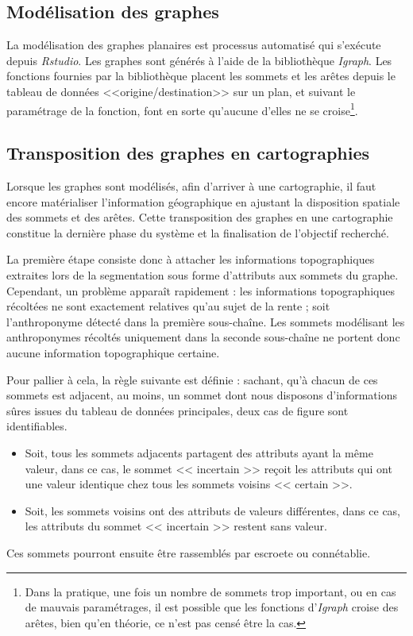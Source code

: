 \subsection{Modélisation des graphes}
La modélisation des graphes planaires est processus automatisé qui s'exécute depuis \textit{Rstudio}. Les graphes sont générés à l'aide de la bibliothèque \textit{Igraph}. Les fonctions fournies par la bibliothèque placent les sommets et les arêtes depuis le tableau de données <<origine/destination>> sur un plan, et suivant le paramétrage de la fonction, font en sorte qu'aucune d'elles ne se croise\footnote{Dans la pratique, une fois un nombre de sommets trop important, ou en cas de mauvais paramétrages, il est possible que les fonctions d'\textit{Igraph} croise des arêtes, bien qu'en théorie, ce n'est pas censé être la cas.}. 

\subsection{Transposition des graphes en cartographies}
Lorsque les graphes sont modélisés, afin d'arriver à une cartographie, il faut encore matérialiser l'information géographique en ajustant la disposition spatiale des sommets et des arêtes. Cette transposition des graphes en une cartographie constitue la dernière phase du système et la finalisation de l'objectif recherché. 

La première étape consiste donc à attacher les informations topographiques extraites lors de la segmentation sous forme d'attributs aux sommets du graphe. Cependant, un problème apparaît rapidement : les informations topographiques récoltées ne sont exactement relatives qu'au sujet de la rente ; soit l'anthroponyme détecté dans la première sous-chaîne. Les sommets modélisant les anthroponymes récoltés uniquement dans la seconde sous-chaîne ne portent donc aucune information topographique certaine. 

Pour pallier à cela, la règle suivante est définie : sachant, qu'à chacun de ces sommets est adjacent, au moins, un sommet dont  nous disposons d'informations sûres issues du tableau de données principales, deux cas de figure sont identifiables.
\begin{itemize}
    \item Soit, tous les sommets adjacents partagent des attributs ayant la même valeur, dans ce cas,  le sommet << incertain >> reçoit les attributs qui ont une valeur identique chez tous les sommets voisins << certain >>.
    \item Soit, les sommets voisins ont des attributs de valeurs différentes, dans ce cas, les attributs du sommet << incertain >>  restent sans valeur.
\end{itemize}
Ces sommets pourront ensuite être rassemblés par escroete ou connétablie.

